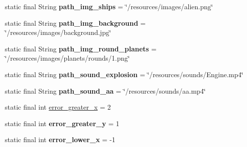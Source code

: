 \begin{DoxyCompactItemize}
static final String {\bfseries path\+\_\+img\+\_\+ships} = \char`\"{}/resources/images/alien.\+png\char`\"{}
\item 
\mbox{\label{classfr_1_1groupe40_1_1projet_1_1util_1_1_constantes_a856e41952c8ff7dfcf4fca745158b1f8}} 
static final String {\bfseries path\+\_\+img\+\_\+background} = \char`\"{}/resources/images/background.\+jpg\char`\"{}
\item 
\mbox{\label{classfr_1_1groupe40_1_1projet_1_1util_1_1_constantes_ae38a63f959bf2dfa3323116ce1a6ed97}} 
static final String {\bfseries path\+\_\+img\+\_\+round\+\_\+planets} = \char`\"{}/resources/images/planets/rounds/1.png\char`\"{}
\item 
\mbox{\label{classfr_1_1groupe40_1_1projet_1_1util_1_1_constantes_a5f11c8e5328f29b02c0d2ecaf2e956e8}} 
static final String {\bfseries path\+\_\+sound\+\_\+explosion} = \char`\"{}/resources/sounds/Engine.\+mp4\char`\"{}
\item 
\mbox{\label{classfr_1_1groupe40_1_1projet_1_1util_1_1_constantes_a6dfc890788fa7a55f9194e90e8964a81}} 
static final String {\bfseries path\+\_\+sound\+\_\+aa} = \char`\"{}/resources/sounds/aa.\+mp4\char`\"{}
\item 
static final int \mbox{\hyperlink{classfr_1_1groupe40_1_1projet_1_1util_1_1_constantes_a338cc553a2a019cfc248741a981e5874}{error\+\_\+greater\+\_\+x}} = 2
\item 
\mbox{\label{classfr_1_1groupe40_1_1projet_1_1util_1_1_constantes_aec60ac263e8c5fdc8de6f3a0f945ede2}} 
static final int {\bfseries error\+\_\+greater\+\_\+y} = 1
\item 
\mbox{\label{classfr_1_1groupe40_1_1projet_1_1util_1_1_constantes_a95f10dc55de1dba3b07fbb7354fa9a76}} 
static final int {\bfseries error\+\_\+lower\+\_\+x} = -\/1
\item 
\mbox{\label{classfr_1_1groupe40_1_1projet_1_1util_1_1_constantes_a1e30c221c612fd160382d4b05290cb4c}} 

\end{DoxyCompactItemize}
